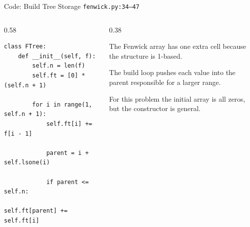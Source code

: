 \documentclass[aspectratio=169,11pt]{beamer}
\begin{document}
\begin{frame}[fragile]{Code: Build Tree Storage}
\scriptsize
{} \texttt{fenwick.py:34--47}

\vspace{0.08cm}
\begin{columns}[T,totalwidth=\textwidth]
\begin{column}{0.58\textwidth}
\begin{lstlisting}[style=cpcode]
class FTree:
    def __init__(self, f):
        self.n = len(f)
        self.ft = [0] * (self.n + 1)

        for i in range(1, self.n + 1):
            self.ft[i] += f[i - 1]

            parent = i + self.lsone(i)

            if parent <= self.n:
                self.ft[parent] += self.ft[i]
\end{lstlisting}
\end{column}
\begin{column}{0.38\textwidth}
\begin{tightitemize}
  \item The Fenwick array has one extra cell because the structure is 1-based.
  \item The build loop pushes each value into the parent responsible for a larger range.
  \item For this problem the initial array is all zeros, but the constructor is general.
\end{tightitemize}
\end{column}
\end{columns}
\end{frame}
\end{document}
